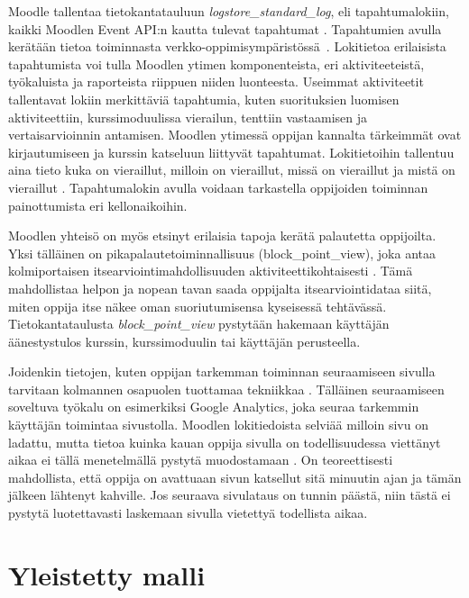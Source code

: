 Moodle tallentaa tietokantatauluun \emph{logstore\_standard\_log}, eli tapahtumalokiin, kaikki Moodlen Event API:n kautta tulevat tapahtumat \citep{dougiamasMoodle2022, dougiamasLoggingMoodleDocs2021}. Tapahtumien avulla kerätään tietoa toiminnasta verkko-oppimisympäristössä~\citep{agudo-peregrinaCanWePredict2014}. Lokitietoa erilaisista tapahtumista voi tulla Moodlen ytimen komponenteista, eri aktiviteeteistä, työkaluista ja raporteista riippuen niiden luonteesta. Useimmat aktiviteetit tallentavat lokiin merkittäviä tapahtumia, kuten suorituksien luomisen aktiviteettiin, kurssimoduulissa vierailun, tenttiin vastaamisen ja vertaisarvioinnin antamisen. Moodlen ytimessä oppijan kannalta tärkeimmät ovat kirjautumiseen ja kurssin katseluun liittyvät tapahtumat. Lokitietoihin tallentuu aina tieto kuka on vieraillut, milloin on vieraillut, missä on vieraillut ja mistä on vieraillut \citep{abdullahLearningStyleClassification2015}. Tapahtumalokin avulla voidaan tarkastella oppijoiden toiminnan painottumista eri kellonaikoihin.

Moodlen yhteisö on myös etsinyt erilaisia tapoja kerätä palautetta oppijoilta. Yksi tälläinen on pikapalautetoiminnallisuus (block\_point\_view), joka antaa kolmiportaisen itsearviointimahdollisuuden aktiviteettikohtaisesti \citep{fombaronMoodlePluginPoint2021}. Tämä mahdollistaa helpon ja nopean tavan saada oppijalta itsearviointidataa siitä, miten oppija itse näkee oman suoriutumisensa kyseisessä tehtävässä. Tietokantataulusta \emph{block\_point\_view} pystytään hakemaan käyttäjän äänestystulos kurssin, kurssimoduulin tai käyttäjän perusteella.

Joidenkin tietojen, kuten oppijan tarkemman toiminnan seuraamiseen sivulla tarvitaan kolmannen osapuolen tuottamaa tekniikkaa \citep{filvaGoogleAnalyticsTime2014}. Tälläinen seuraamiseen soveltuva työkalu on esimerkiksi Google Analytics, joka seuraa tarkemmin käyttäjän toimintaa sivustolla. Moodlen lokitiedoista selviää milloin sivu on ladattu, mutta tietoa kuinka kauan oppija sivulla on todellisuudessa viettänyt aikaa ei tällä menetelmällä pystytä muodostamaan \citep{dougiamasMoodle2022}. On teoreettisesti mahdollista, että oppija on avattuaan sivun katsellut sitä minuutin ajan ja tämän jälkeen lähtenyt kahville. Jos seuraava sivulataus on tunnin päästä, niin tästä ei pystytä luotettavasti laskemaan sivulla vietettyä todellista aikaa.

\section{Yleistetty malli}


